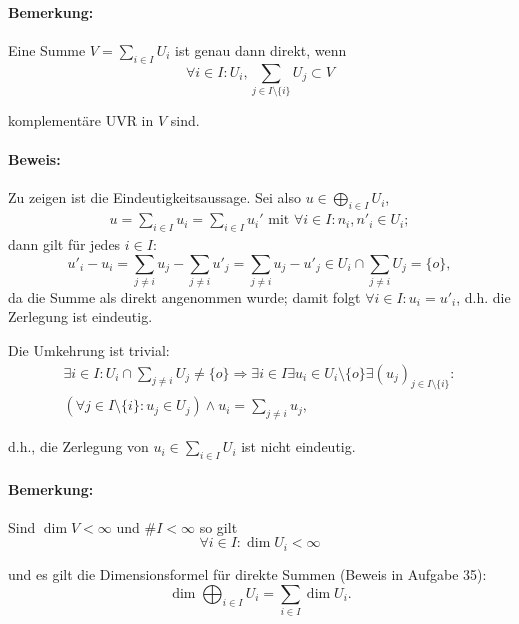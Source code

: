 \paragraph{Bemerkung: }
	Eine Summe $ V = \sum_{i\in I} U_i $ ist genau dann direkt, wenn
		\begin{equation*}
		\forall i\in I: U_i, \sum_{j\in I\setminus\{i\}}U_j \subset V
		\end{equation*}
		
	komplementäre UVR in $ V $ sind.

\paragraph{Beweis: }
	Zu zeigen ist die Eindeutigkeitsaussage. Sei also $ u \in \bigoplus_{i\in I}U_i $,
		\begin{gather*}
		u = \sum_{i\in I} u_i = \sum_{i\in I} u_i' \text{ mit } \forall i\in I: n_i,n'_i\in U_i;
		\end{gather*}
	dann gilt für jedes $ i\in I$:
		\begin{equation*}
		u'_i-u_i = \sum _{j\neq i}u_j-\sum_{j\neq i} u'_j = \sum_{j\neq i}u_j-u'_j \in U_i\cap \sum_{j\neq i} U_j = \{o\},
		\end{equation*}
	da die Summe als direkt angenommen wurde; damit folgt $ \forall i \in I: u_i = u'_i $, d.h. die Zerlegung ist eindeutig.
	
	Die Umkehrung ist trivial:
		\begin{gather*}
		\exists i\in I:U_i\cap \sum_{j\neq i} U_j \neq \{o\} \Rightarrow \exists i\in I\exists u_i\in U_i\setminus\{o\}\exists (u_j)_{j\in I\setminus\{i\}}:\\
		(\forall j\in I\setminus\{i\}:u_j \in U_j)\land u_i = \sum_{j\neq i} u_j,
		\end{gather*}
		
	d.h., die Zerlegung von $ u_i\in \sum_{i\in I}U_i $ ist nicht eindeutig.

\paragraph{Bemerkung: }
	Sind $ \dim V <\infty $ und $ \# I < \infty $ so gilt
		\begin{equation*}
		\forall i\in I: \dim U_i < \infty
		\end{equation*}
		
	und es gilt die Dimensionsformel für direkte Summen (Beweis in Aufgabe 35):
		\begin{equation*}
		\dim \bigoplus_{i\in I}U_i = \sum_{i\in I} \dim U_i.
		\end{equation*}
	
